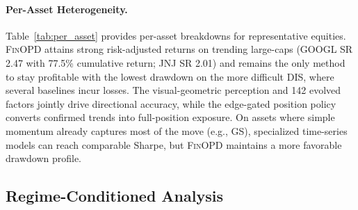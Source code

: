 \paragraph{Per-Asset Heterogeneity.} Table~\ref{tab:per_asset} provides per-asset breakdowns for representative equities. \textsc{FinOPD} attains strong risk-adjusted returns on trending large-caps (GOOGL SR 2.47 with 77.5\% cumulative return; JNJ SR 2.01) and remains the only method to stay profitable with the lowest drawdown on the more difficult DIS, where several baselines incur losses. The visual-geometric perception and 142 evolved factors jointly drive directional accuracy, while the edge-gated position policy converts confirmed trends into full-position exposure. On assets where simple momentum already captures most of the move (e.g., GS), specialized time-series models can reach comparable Sharpe, but \textsc{FinOPD} maintains a more favorable drawdown profile.

\subsection{Regime-Conditioned Analysis}



